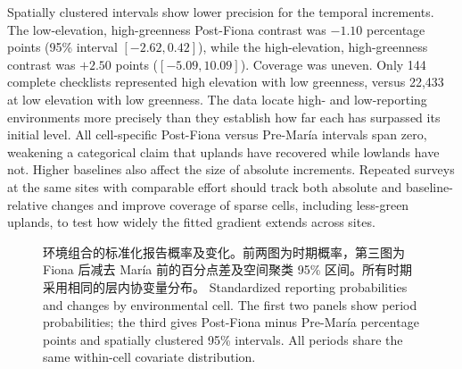 \else
Spatially clustered intervals show lower precision for the temporal increments. The low-elevation, high-greenness Post-Fiona contrast was $-1.10$ percentage points (95\% interval $[-2.62,0.42]$), while the high-elevation, high-greenness contrast was $+2.50$ points ($[-5.09,10.09]$). Coverage was uneven. Only 144 complete checklists represented high elevation with low greenness, versus 22,433 at low elevation with low greenness. The data locate high- and low-reporting environments more precisely than they establish how far each has surpassed its initial level. All cell-specific Post-Fiona versus Pre-Mar\'ia intervals span zero, weakening a categorical claim that uplands have recovered while lowlands have not. Higher baselines also affect the size of absolute increments. Repeated surveys at the same sites with comparable effort should track both absolute and baseline-relative changes and improve coverage of sparse cells, including less-green uplands, to test how widely the fitted gradient extends across sites.
\fi
\begin{figure}[htbp]\centering
{}
\caption{\ifzh
环境组合的标准化报告概率及变化。前两图为时期概率，第三图为 Fiona 后减去 María 前的百分点差及空间聚类 95\% 区间。所有时期采用相同的层内协变量分布。
\else
Standardized reporting probabilities and changes by environmental cell. The first two panels show period probabilities; the third gives Post-Fiona minus Pre-Mar\'ia percentage points and spatially clustered 95\% intervals. All periods share the same within-cell covariate distribution.
\fi}\label{fig:envrebound}
\end{figure}
\FloatBarrier

